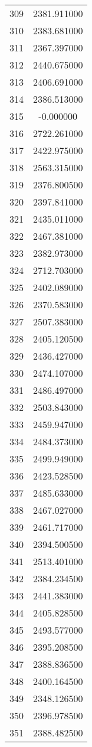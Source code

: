 \documentclass[12pt]{article}
\begin{document}
\begin{longtable}{@{}cc@{}}
309 & 2381.911000 \\
310 & 2383.681000 \\
311 & 2367.397000 \\
312 & 2440.675000 \\
313 & 2406.691000 \\
314 & 2386.513000 \\
315 & -0.000000 \\
316 & 2722.261000 \\
317 & 2422.975000 \\
318 & 2563.315000 \\
319 & 2376.800500 \\
320 & 2397.841000 \\
321 & 2435.011000 \\
322 & 2467.381000 \\
323 & 2382.973000 \\
324 & 2712.703000 \\
325 & 2402.089000 \\
326 & 2370.583000 \\
327 & 2507.383000 \\
328 & 2405.120500 \\
329 & 2436.427000 \\
330 & 2474.107000 \\
331 & 2486.497000 \\
332 & 2503.843000 \\
333 & 2459.947000 \\
334 & 2484.373000 \\
335 & 2499.949000 \\
336 & 2423.528500 \\
337 & 2485.633000 \\
338 & 2467.027000 \\
339 & 2461.717000 \\
340 & 2394.500500 \\
341 & 2513.401000 \\
342 & 2384.234500 \\
343 & 2441.383000 \\
344 & 2405.828500 \\
345 & 2493.577000 \\
346 & 2395.208500 \\
347 & 2388.836500 \\
348 & 2400.164500 \\
349 & 2348.126500 \\
350 & 2396.978500 \\
351 & 2388.482500 \\

\end{longtable}
\end{document}
